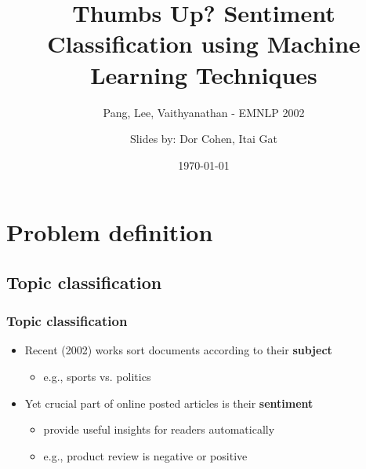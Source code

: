 \documentclass{beamer}
\title{Thumbs Up? Sentiment Classification using Machine Learning Techniques}
\subtitle{Pang, Lee, Vaithyanathan - EMNLP 2002}
\author{Slides by: Dor Cohen, Itai Gat}
\institute{IE\&M @ Technion}
\date{\today}
\begin{document}
\begin{frame}
	\titlepage
\end{frame}

\section{Problem definition}

\iffalse
\subsection{Topic classification}

\begin{frame}
	\frametitle{Topic classification}
	\begin{itemize}
	\item Recent (2002) works sort documents according to their \textbf{subject}
	\begin{itemize}
		\item e.g., sports vs. politics
	\end{itemize}
	\pause
	\item Yet crucial part of online posted articles is their \textbf{sentiment}
	\begin{itemize}
		\item provide useful insights for readers automatically
		\item e.g., product review is negative or positive
	\end{itemize}

	\end{itemize}
\end{frame}

\end{document}
